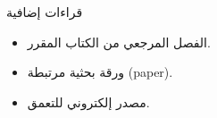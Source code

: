 \documentclass[aspectratio=169,11pt]{beamer}
\let\textEN\textenglish
\begin{document}
\begin{frame}{قراءات إضافية}
\begin{itemize}
  \item الفصل المرجعي من الكتاب المقرر.
  \item ورقة بحثية مرتبطة \textEN{(paper)}.
  \item مصدر إلكتروني للتعمق.
\end{itemize}
\end{frame}
\end{document}
